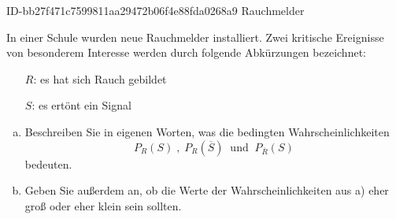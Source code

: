 \begin{exercise}
      {ID-bb27f471c7599811aa29472b06f4e88fda0268a9}
      {Rauchmelder}
  \ifproblem\problem\par
    In einer Schule wurden neue Rauchmelder
    installiert.
    Zwei kritische Ereignisse von besonderem
    Interesse werden durch folgende Abkürzungen
    bezeichnet:
    \begin{itemize}
      \renewcommand{\itemsep}{-1ex}%
      \item[$R$:]\glqq es hat sich Rauch gebildet\grqq
      \item[$S$:]\glqq es ertönt ein Signal\grqq
    \end{itemize}
    \begin{enumerate}[a)]
      \item Beschreiben Sie in eigenen Worten, was die
            bedingten Wahrscheinlichkeiten
            \begin{equation*}
              P_R(S)
              \;,\;
              P_R(\overline{S})
              \;\;\text{und}\;\;
              P_{\overline{R}}(S)
            \end{equation*}
            bedeuten.
      \item Geben Sie außerdem an, ob die
            Werte der Wahrscheinlichkeiten aus
            a) eher groß oder eher klein sein
            sollten.
    \end{enumerate}
  \fi
\end{exercise}



